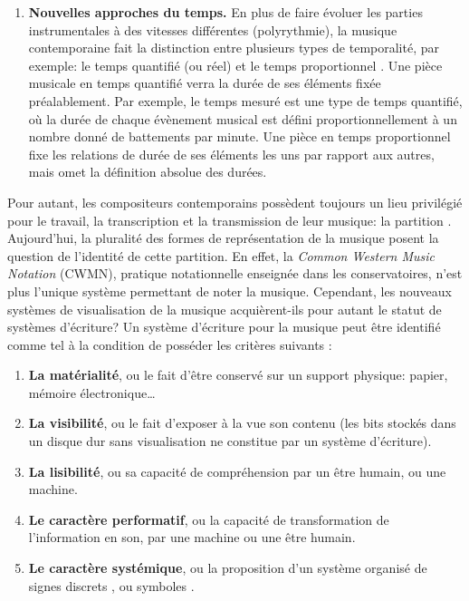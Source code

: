 \begin{enumerate}[label={(\arabic*)}]
	\item \textbf{Nouvelles approches du temps.} En plus de faire évoluer les parties instrumentales à des vitesses différentes (polyrythmie), la musique contemporaine fait la distinction entre plusieurs types de temporalité, par exemple: le temps quantifié (ou réel) et le temps proportionnel \cite{honing1993}. Une pièce musicale en temps quantifié verra la durée de ses éléments fixée préalablement. Par exemple, le temps mesuré est une type de temps quantifié, où la durée de chaque évènement musical est défini proportionnellement à un nombre donné de battements par minute. Une pièce en temps proportionnel fixe les relations de durée de ses éléments les uns par rapport aux autres, mais omet la définition absolue des durées. 
\end{enumerate}

Pour autant, les compositeurs contemporains possèdent toujours un lieu privilégié pour le travail, la transcription et la transmission de leur musique: la partition \cite{bresson2008}.
Aujourd'hui, la pluralité des formes de représentation de la musique posent la question de l'identité de cette partition. En effet, la \textit{Common Western Music Notation} (CWMN), pratique notationnelle enseignée dans les conservatoires, n'est plus l'unique système permettant de noter la musique. Cependant, les nouveaux systèmes de visualisation de la musique acquièrent-ils pour autant le statut de systèmes d'écriture? 
Un système d'écriture pour la musique peut être identifié comme tel à la condition de posséder les critères suivants \cite{veitl2007}:

\begin{enumerate}[label={(\arabic*)}]
	\item \textbf{La matérialité}, ou le fait d'être conservé sur un support physique: papier, mémoire électronique…	
	\item \textbf{La visibilité}, ou le fait d'exposer à la vue son contenu (les bits stockés dans un disque dur sans visualisation ne constitue par un système d'écriture).
	\item \textbf{La lisibilité}, ou sa capacité de compréhension par un être humain, ou une machine.
	\item \textbf{Le caractère performatif}, ou la capacité de transformation de l'information en son, par une machine ou une être humain.
	\item \textbf{Le caractère systémique}, ou la proposition d'un système organisé de \og signes discrets \fg, ou \og symboles \fg.
\end{enumerate}

